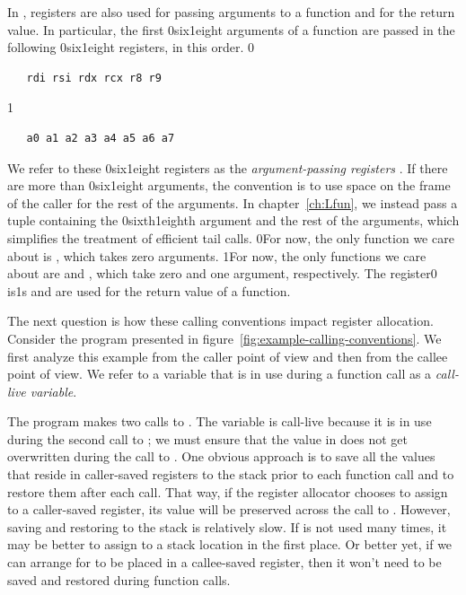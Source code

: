 \documentclass[7x10]{TimesAPriori_MIT}%
\def\racketEd{0}
\def\pythonEd{1}
\def\edition{1}
\def\xeightysixEd{0}
\def\riscvEd{1}
\def\architecture{1}
\newcommand\ifriscv[1]{\if\architecture\riscvEd{#1}\fi}
\newcommand\ifxeightsix[1]{\if\architecture\xeightysixEd{#1}\fi}
\newcommand{\racket}[1]{{\if\edition\racketEd{#1}\fi}}
\newcommand{\pythonColor}[0]{}
\newcommand{\python}[1]{{\if\edition\pythonEd\pythonColor #1\fi}}
\numberwithin{theorem}{chapter}
\numberwithin{definition}{chapter}
\numberwithin{equation}{chapter}
\begin{document}
In {\ArchName}, registers are also used for passing arguments to a function
and for the return value.  In particular, the first \ifxeightsix{six}\ifriscv{eight} arguments of a
function are passed in the following \ifxeightsix{six}\ifriscv{eight} registers, in this order.
\if\architecture\xeightysixEd
\begin{lstlisting}
   rdi rsi rdx rcx r8 r9
\end{lstlisting}
\fi
\if\architecture\riscvEd
\begin{lstlisting}
   a0 a1 a2 a3 a4 a5 a6 a7
\end{lstlisting}
\fi
We refer to these \ifxeightsix{six}\ifriscv{eight} registers as the \emph{argument-passing registers}
.
If there are more than \ifxeightsix{six}\ifriscv{eight} arguments, the convention is to use space
on the frame of the caller for the rest of the arguments. In
chapter~\ref{ch:Lfun}, we instead pass a tuple containing the \ifxeightsix{sixth}\ifriscv{eighth}
argument and the rest of the arguments, which simplifies the treatment
of efficient tail calls.
%
\racket{For now, the only function we care about is ,
  which takes zero arguments.}
%
\python{For now, the only functions we care about are \code{read\_int}
  and \code{print\_int}, which take zero and one argument, respectively.}
%
The register\ifxeightsix{  is}\ifriscv{s  and
   are} used for the return value of a function.

The next question is how these calling conventions impact register
allocation. Consider the \LangVar{} program presented in
figure~\ref{fig:example-calling-conventions}.  We first analyze this
example from the caller point of view and then from the callee point
of view. We refer to a variable that is in use during a function call
as a \emph{call-live variable}.

The program makes two calls to \READOP{}.  The variable  is
call-live because it is in use during the second call to \READOP{}; we
must ensure that the value in  does not get overwritten during
the call to \READOP{}.  One obvious approach is to save all the values
that reside in caller-saved registers to the stack prior to each
function call and to restore them after each call. That way, if the
register allocator chooses to assign  to a caller-saved
register, its value will be preserved across the call to \READOP{}.
However, saving and restoring to the stack is relatively slow. If
 is not used many times, it may be better to assign 
to a stack location in the first place. Or better yet, if we can
arrange for  to be placed in a callee-saved register, then it
won't need to be saved and restored during function calls.
\end{document}
